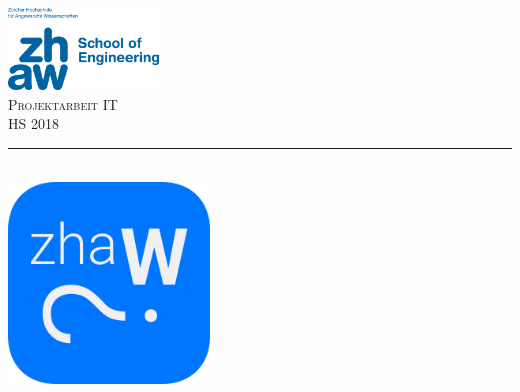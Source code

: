 
\begin{titlepage} %
	\newcommand{\HRule}{\rule{\linewidth}{0.5mm}} %

	\center %


	\includegraphics[width=0.3\textwidth, left]{../../assets/zhawLogo.jpeg}\\[1cm]

	\textsc{\Large Projektarbeit IT}\\[0.5cm] %

	\textsc{\large HS 2018}\\[0.5cm] %


	\HRule\\[0.5cm]


	\includegraphics[width=0.4\textwidth]{../../assets/zhawoLogo.png}\\[0.5cm]


\end{titlepage}
